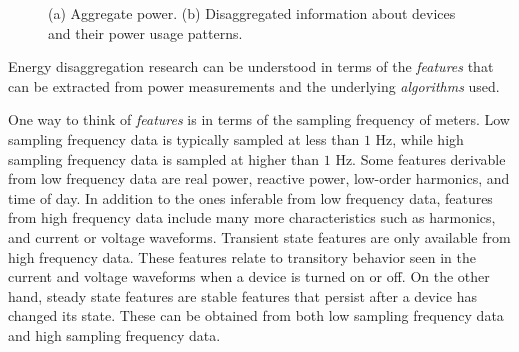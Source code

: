 \begin{figure}[ht]
	\caption{ (a) Aggregate power. (b) Disaggregated information
about devices and their power usage patterns.}
	\label{fig_energyDisaggDefinition}
\end{figure}

Energy disaggregation research can be understood in terms of 
the {\em features} that can be extracted from power measurements and
the underlying {\em algorithms} used.

One way to think of {\it features}
is in terms of
the sampling frequency
of meters. Low sampling frequency data is typically sampled at less than
$1$ Hz, while high sampling frequency data is sampled at higher than $1$ Hz.
Some features derivable from low frequency data are real power, reactive power,
low-order harmonics, and time of day. In addition to the ones inferable from
low frequency data, features from high frequency data include
many more characteristics such as harmonics, and current or voltage waveforms.
Transient state features are only available from high frequency data. 
These features relate to transitory behavior seen in the current and voltage
waveforms when a device is turned on or off. 
On the other hand, steady state features are stable features that persist
after a device has changed its state. These
can be obtained from both low sampling frequency data and high sampling
frequency data. 

